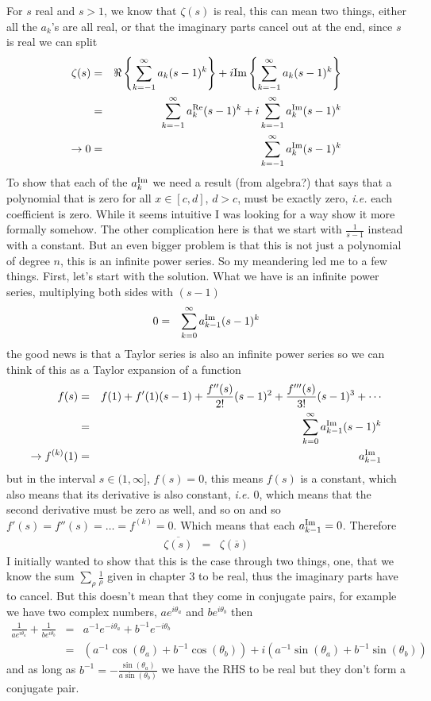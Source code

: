 \documentclass[aps,preprint,preprintnumbers,nofootinbib,showpacs,prd]{revtex4-1}
\newcommand{\ie}{{\it i.e.} }
\newcommand{\nbea}{\begin{eqnarray*}}
\newcommand{\neea}{\end{eqnarray*}}
\def\Im{{\rm Im}}
\begin{document}
For $s$ real and $s > 1$, we know that $\zeta(s)$ is real, this can mean two things, either all the $a_k$'s are all real, or that the imaginary parts cancel out at the end, since $s$ is real we can split
%
\nbea
\zeta(s) & = & \Re\left\{\sum_{k=-1}^\infty a_k (s-1)^k\right\} + i\Im\left\{ \sum_{k=-1}^\infty a_k (s-1)^k \right\} \\
& = & \sum_{k=-1}^\infty a^{\rm Re}_k (s-1)^k + i\sum_{k=-1}^\infty a^{\rm Im}_k (s-1)^k \\
\to 0 & = & \sum_{k=-1}^\infty a^{\rm Im}_k (s-1)^k
\neea
%
To show that each of the $a^{\rm Im}_k$ we need a result (from algebra?) that says that a polynomial that is zero for all $x\in [c,d]$, $d > c$, must be exactly zero, \ie each coefficient is zero. While it seems intuitive I was looking for a way show it more formally somehow. The other complication here is that we start with $\frac{1}{s-1}$ instead with a constant. But an even bigger problem is that this is not just a polynomial of degree $n$, this is an infinite power series. So my meandering led me to a few things. First, let's start with the solution. What we have is an infinite power series, multiplying both sides with $(s-1)$
%
\nbea
0 & = & \sum_{k=0}^\infty a_{k-1}^{\rm Im} (s-1)^k 
\neea
%
the good news is that a Taylor series is also an infinite power series so we can think of this as a Taylor expansion of a function
%
\nbea
f(s) & = & f(1) + f'(1)(s-1) + \frac{f''(s)}{2!}(s-1)^2 + \frac{f'''(s)}{3!}(s-1)^3 + \cdots \\
& = & \sum_{k=0}^\infty a_{k-1}^{\rm Im} (s-1)^k \\
\to f^{(k)}(1) & = & a_{k-1}^{\rm Im}
\neea
%
but in the interval $s \in (1,\infty]$, $f(s) = 0$, this means $f(s)$ is a constant, which also means that its derivative is also constant, \ie 0, which means that the second derivative must be zero as well, and so on and so $f'(s) = f''(s) = \dots = f^{(k)} = 0$. Which means that each $a_{k-1}^{\rm Im} = 0$. Therefore
%
\nbea
\overline{\zeta(s)} & = & \zeta(\overline{s})
\neea
%
I initially wanted to show that this is the case through two things, one, that we know the sum $\sum_{\rho} \frac{1}{\rho}$ given in chapter 3 to be real, thus the imaginary parts have to cancel. But this doesn't mean that they come in conjugate pairs, for example  we have two complex numbers, $ae^{i\theta_a}$ and $be^{i\theta_b}$ then
%
\nbea
\frac{1}{a e^{i\theta_a}} + \frac{1}{b e^{i\theta_b}} & = & a^{-1} e^{-i\theta_a} + b^{-1} e^{-i\theta_b} \\
& = & (a^{-1} \cos(\theta_a) + b^{-1} \cos(\theta_b)) + i(a^{-1}\sin(\theta_a) + b^{-1}\sin(\theta_b))
\neea
%
and as long as $b^{-1} = -\frac{\sin(\theta_a)}{a \sin(\theta_b)}$ we have the RHS to be real but they don't form a conjugate pair.
\end{document}
